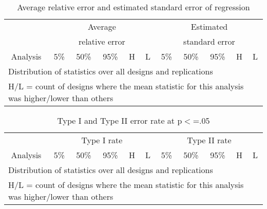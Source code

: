 \documentclass[10pt]{a0poster}
\begin{document}
\begin{table}[ht]
\begin{center}
\caption{Average relative error and estimated standard error of regression}
\begin{tabular}{lrrrrrrrrrr}
\toprule
&\multicolumn{5}{c}{Average}&\multicolumn{5}{c}{Estimated} \\
&\multicolumn{5}{c}{relative error}&\multicolumn{5}{c}{standard error} \\
\cmidrule(l{.75em}){2-6}\cmidrule(l{.75em}){7-11}
\multicolumn{1}{c}{Analysis}&\multicolumn{1}{c}{5\%}&\multicolumn{1}{c}{50\%}&\multicolumn{1}{c}{95\%}&\multicolumn{1}{c}{H}&\multicolumn{1}{c}{L}&\multicolumn{1}{c}{5\%}&\multicolumn{1}{c}{50\%}&\multicolumn{1}{c}{95\%}&\multicolumn{1}{c}{H}&\multicolumn{1}{c}{L} \\
\midrule

\bottomrule
\multicolumn{11}{l}{\footnotesize{Distribution of statistics over all designs and replications}} \\
\multicolumn{11}{l}{\footnotesize{H/L = count of designs where the mean statistic for this analysis was higher/lower than others}} \\
\end{tabular}
\end{center}
\end{table}

\begin{table}[ht]
\begin{center}
\caption{Type I and Type II error rate at p$<$=.05}
\begin{tabular}{lrrrrrrrrrr}
\toprule
&\multicolumn{5}{c}{Type I rate}&\multicolumn{5}{c}{Type II rate} \\
\cmidrule(l{.75em}){2-6}\cmidrule(l{.75em}){7-11}
\multicolumn{1}{c}{Analysis}&\multicolumn{1}{c}{5\%}&\multicolumn{1}{c}{50\%}&\multicolumn{1}{c}{95\%}&\multicolumn{1}{c}{H}&\multicolumn{1}{c}{L}&\multicolumn{1}{c}{5\%}&\multicolumn{1}{c}{50\%}&\multicolumn{1}{c}{95\%}&\multicolumn{1}{c}{H}&\multicolumn{1}{c}{L} \\
\midrule

\bottomrule
\multicolumn{11}{l}{\footnotesize{Distribution of statistics over all designs and replications}} \\
\multicolumn{11}{l}{\footnotesize{H/L = count of designs where the mean statistic for this analysis was higher/lower than others}} \\
\end{tabular}
\end{center}
\end{table}
\end{document}
